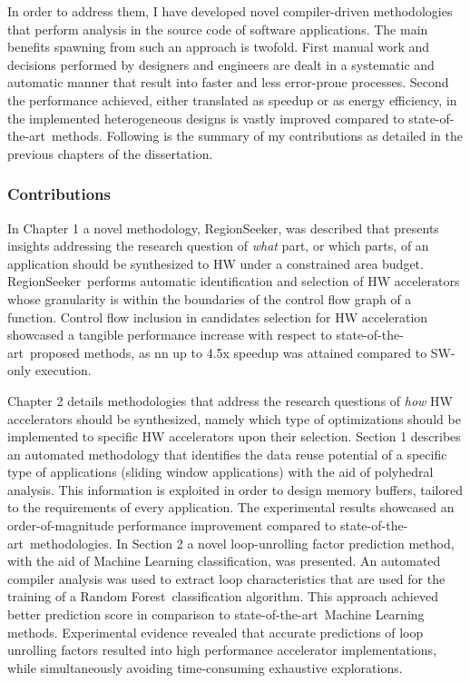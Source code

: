 \documentclass[]{usiinfthesis}
\newcommand{\rseeker}{{RegionSeeker}}
\newcommand{\SoTA}{{state-of-the-art}}
\newcommand{\RF}{{Random Forest}}
\begin{document}
In order to address them, I have developed novel compiler-driven methodologies that perform 
analysis in the source code of software applications. The main benefits spawning from such an 
approach is twofold. First manual work and decisions performed by designers and engineers are dealt in 
a systematic and automatic manner that result into faster and less error-prone processes.
Second the performance achieved, either translated as speedup or as energy 
efficiency, in the implemented heterogeneous designs is vastly improved compared to \SoTA\ methods.
Following is the summary of my contributions as detailed in the previous chapters of the dissertation.
\par

\subsubsection{Contributions}

In Chapter 1 a novel methodology, \rseeker, was described that presents insights addressing the research question of {\em what} part, or which parts, of an application should be synthesized to HW under a constrained area budget. \rseeker\ performs automatic identification and selection of HW accelerators whose granularity is within the boundaries 
of the control flow graph of a function.
Control flow inclusion in candidates selection for HW acceleration showcased a tangible performance increase with respect to \SoTA\ 
proposed methods, as nn up to 4.5x speedup was attained compared to SW-only execution.\par

Chapter 2 details methodologies that address the research questions of {\em how} HW
accelerators should be synthesized, namely which type of optimizations should be implemented
to specific HW accelerators upon their selection. Section 1 describes an automated 
methodology that identifies the data reuse potential of a specific type of applications
(sliding window applications) with the aid of polyhedral analysis. This information is 
exploited in order to design memory buffers, tailored to the requirements of every application. The experimental results showcased an order-of-magnitude performance 
improvement compared to \SoTA\ methodologies.
In Section 2 a novel loop-unrolling factor prediction 
method, with the aid of Machine Learning classification, was presented. An automated compiler
analysis was used to extract loop characteristics that are used for the training of a \RF\ classification algorithm. This approach achieved better prediction score 
in comparison to \SoTA\ Machine Learning methods. Experimental evidence revealed that 
accurate predictions of loop unrolling factors resulted into high performance accelerator implementations, while simultaneously avoiding time-consuming exhaustive explorations.\par
\end{document}
